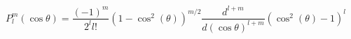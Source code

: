 \documentclass[border=2pt,varwidth]{standalone}
\begin{document}
\[
  P_l^m(\cos \theta) =
  \frac{(-1)^m}{2^l l!}
  (1-\cos^2(\theta))^{m/2}
  \frac{d^{l+m}}{d(\cos \theta)^{l+m}}
  (\cos^2(\theta)-1)^l
\]
\end{document}
